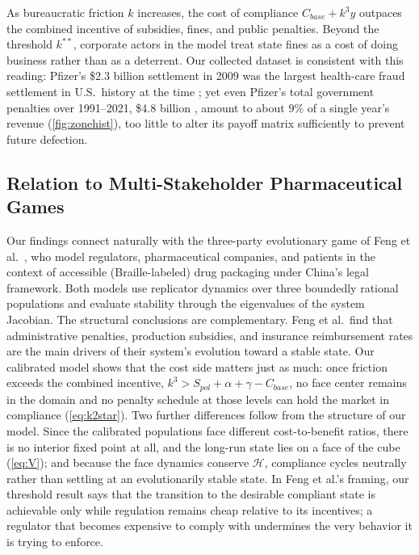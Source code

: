 \documentclass[10pt]{article}
\begin{document}
As bureaucratic friction $k$ increases, the cost of compliance $C_{base}+k^3 y$ outpaces the combined incentive of subsidies, fines, and public penalties. Beyond the threshold $k^{**}$, corporate actors in the model treat state fines as a cost of doing business rather than as a deterrent. Our collected dataset is consistent with this reading: Pfizer's \$2.3 billion settlement in 2009 was the largest health-care fraud settlement in U.S.\ history at the time \cite{doj2009}; yet even Pfizer's total government penalties over 1991--2021, \$4.8 billion \cite{publiccitizen2024}, amount to about $9\%$ of a single year's revenue (\cref{fig:zonehist}), too little to alter its payoff matrix sufficiently to prevent future defection.

\subsection{Relation to Multi-Stakeholder Pharmaceutical Games}
Our findings connect naturally with the three-party evolutionary game of Feng et al.\ \cite{feng2024}, who model regulators, pharmaceutical companies, and patients in the context of accessible (Braille-labeled) drug packaging under China's legal framework. Both models use replicator dynamics over three boundedly rational populations and evaluate stability through the eigenvalues of the system Jacobian. The structural conclusions are complementary. Feng et al.\ find that administrative penalties, production subsidies, and insurance reimbursement rates are the main drivers of their system's evolution toward a stable state. Our calibrated model shows that the cost side matters just as much: once friction exceeds the combined incentive, $k^3>S_{pol}+\alpha+\gamma-C_{base}$, no face center remains in the domain and no penalty schedule at those levels can hold the market in compliance (\cref{eq:k2star}). Two further differences follow from the structure of our model. Since the calibrated populations face different cost-to-benefit ratios, there is no interior fixed point at all, and the long-run state lies on a face of the cube (\cref{eq:V}); and because the face dynamics conserve $\mathcal{H}$, compliance cycles neutrally rather than settling at an evolutionarily stable state. In Feng et al.'s framing, our threshold result says that the transition to the desirable compliant state is achievable only while regulation remains cheap relative to its incentives; a regulator that becomes expensive to comply with undermines the very behavior it is trying to enforce.
\end{document}
